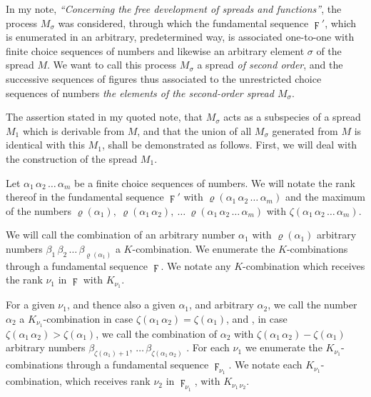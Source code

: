 \documentclass{amsart}
\newcommand\Rank[1]{\varrho\left(#1\right)}
\newcommand\Max[1]{\zeta\left(#1\right)}
\begin{document}


In my note, \emph{``Concerning the free development of spreads and
functions''}, the process $M_\sigma$ was considered, through which
the fundamental sequence $\digamma'$, which is enumerated in an arbitrary,
predetermined way, is associated one-to-one with finite choice sequences of
numbers and likewise an arbitrary element $\sigma$ of the spread $M$. We want to call this process $M_\sigma$ a
spread \emph{of second order}, and the successive sequences of figures thus
associated to the unrestricted choice sequences of numbers  \emph{the elements of the second-order spread $M_\sigma$}.

The assertion stated in my quoted note, that $M_\sigma$ acts as a subspecies of
a spread $M_1$ which is derivable from $M$, and that the union of all
$M_\sigma$ generated from $M$ is identical with this $M_1$, shall be
demonstrated as follows. First, we will deal with the construction of the
spread $M_1$.

Let $\alpha_1\, \alpha_2\, \dots\, \alpha_m$ be a finite choice sequences of
numbers. We will notate the rank thereof in the fundamental sequence
$\digamma'$ with $\Rank{\alpha_1\,\alpha_2\,\dots\,\alpha_m}$ and the maximum
of the numbers $\Rank{\alpha_1},\ \Rank{\alpha_1\,\alpha_2},\ \dots\
\Rank{\alpha_1\,\alpha_2\,\dots\,\alpha_m}$ with
$\Max{\alpha_1\,\alpha_2\,\dots\,\alpha_m}$.

We will call the combination of an arbitrary number $\alpha_1$ with
$\Rank{\alpha_1}$ arbitrary numbers
$\beta_1\,\beta_2\,\dots\,\beta_{\Rank{\alpha_1}}$ a $K$-combination. We
enumerate the $K$-combinations through a fundamental sequence $\digamma$. We
notate any $K$-combination which receives the rank $\nu_1$ in $\digamma$ with
$K_{\nu_1}$.

For a given $\nu_1$, and thence also a given $\alpha_1$, and arbitrary
$\alpha_2$, we call the number $\alpha_2$ a $K_{\nu_1}$-combination in case
$\Max{\alpha_1\,\alpha_2} = \Max{\alpha_1}$, and \EdMark{likewise}, in case
$\Max{\alpha_1\,\alpha_2} > \Max{\alpha_1}$, we call the combination of
$\alpha_2$ with $\Max{\alpha_1\,\alpha_2} - \Max{\alpha_1}$ arbitrary numbers
$\beta_{\Max{\alpha_1}+1},\,\dots\,\beta_{\Max{\alpha_1\,\alpha_2}}$ \EdMark{a
$K_{\nu_1}$-combination}. For each $\nu_1$ we enumerate the
$K_{\nu_1}$-combinations through a fundamental sequence $\digamma_{\nu_1}$. We
notate each $K_{\nu_1}$-combination, which receives rank $\nu_2$ in
$\digamma_{\nu_1}$, with $K_{\nu_1\,\nu_2}$.
\end{document}
